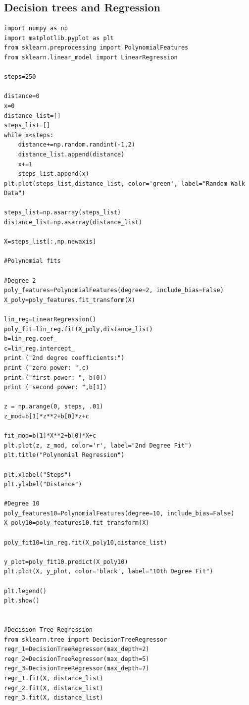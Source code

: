 \documentclass[%
oneside,                 %
final,                   %
10pt]{article}
\begin{document}
\subsection*{Decision trees and Regression}
\begin{verbatim}
import numpy as np
import matplotlib.pyplot as plt
from sklearn.preprocessing import PolynomialFeatures
from sklearn.linear_model import LinearRegression

steps=250

distance=0
x=0
distance_list=[]
steps_list=[]
while x<steps:
    distance+=np.random.randint(-1,2)
    distance_list.append(distance)
    x+=1
    steps_list.append(x)
plt.plot(steps_list,distance_list, color='green', label="Random Walk Data")

steps_list=np.asarray(steps_list)
distance_list=np.asarray(distance_list)

X=steps_list[:,np.newaxis]

#Polynomial fits

#Degree 2
poly_features=PolynomialFeatures(degree=2, include_bias=False)
X_poly=poly_features.fit_transform(X)

lin_reg=LinearRegression()
poly_fit=lin_reg.fit(X_poly,distance_list)
b=lin_reg.coef_
c=lin_reg.intercept_
print ("2nd degree coefficients:")
print ("zero power: ",c)
print ("first power: ", b[0])
print ("second power: ",b[1])

z = np.arange(0, steps, .01)
z_mod=b[1]*z**2+b[0]*z+c

fit_mod=b[1]*X**2+b[0]*X+c
plt.plot(z, z_mod, color='r', label="2nd Degree Fit")
plt.title("Polynomial Regression")

plt.xlabel("Steps")
plt.ylabel("Distance")

#Degree 10
poly_features10=PolynomialFeatures(degree=10, include_bias=False)
X_poly10=poly_features10.fit_transform(X)

poly_fit10=lin_reg.fit(X_poly10,distance_list)

y_plot=poly_fit10.predict(X_poly10)
plt.plot(X, y_plot, color='black', label="10th Degree Fit")

plt.legend()
plt.show()


#Decision Tree Regression
from sklearn.tree import DecisionTreeRegressor
regr_1=DecisionTreeRegressor(max_depth=2)
regr_2=DecisionTreeRegressor(max_depth=5)
regr_3=DecisionTreeRegressor(max_depth=7)
regr_1.fit(X, distance_list)
regr_2.fit(X, distance_list)
regr_3.fit(X, distance_list)


\end{verbatim}
\end{document}
